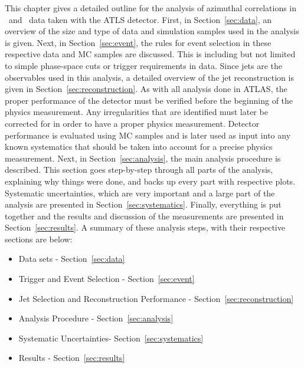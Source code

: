 This chapter gives a detailed outline for the analysis of azimuthal correlations in \pp\ and \pPb\ data taken with the ATLS detector. First, in Section~\ref{sec:data}, an overview of the size and type of data and simulation samples used in the analysis is given. Next, in Section~\ref{sec:event}, the rules for event selection in these respective data and MC samples are discussed. This is including but not limited to simple phase-space cuts or trigger requirements in data. Since jets are the observables used in this analysis, a detailed overview of the jet reconstruction is given in Section~\ref{sec:reconstruction}. As with all analysis done in ATLAS, the proper performance of the detector must be verified before the beginning of the physics measurement. Any irregularities that are identified must later be corrected for in order to have a proper physics measurement. Detector performance is evaluated using MC samples and is later used as input into any known systematics that should be taken into account for a precise physics measurement. Next, in Section~\ref{sec:analysis}, the main analysis procedure is described. This section goes step-by-step through all parts of the analysis, explaining why things were done, and backs up every part with respective plots. Systematic uncertainties, which are very important and a large part of the analysis are presented in Section~\ref{sec:systematics}. Finally, everything is put together and the results and discussion of the measurements are presented in Section~\ref{sec:results}. A summary of these analysis steps, with their respective sections are below:

\begin{itemize}
	\item Data sets - Section~\ref{sec:data}
	\item Trigger and Event Selection - Section~\ref{sec:event}
	\item Jet Selection and Reconstruction Performance - Section~\ref{sec:reconstruction}
	\item Analysis Procedure - Section~\ref{sec:analysis}
	\item Systematic Uncertainties- Section~\ref{sec:systematics}
	\item Results - Section~\ref{sec:results} 
\end{itemize}

\newpage